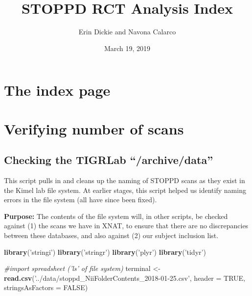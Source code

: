 \documentclass[]{article}
\title{STOPPD RCT Analysis Index}
\author{Erin Dickie and Navona Calarco}
\date{March 19, 2019}
\newenvironment{Shaded}{\begin{snugshade}}{\end{snugshade}}
\newcommand{\KeywordTok}[1]{\textcolor[rgb]{0.13,0.29,0.53}{\textbf{#1}}}
\newcommand{\DataTypeTok}[1]{\textcolor[rgb]{0.13,0.29,0.53}{#1}}
\newcommand{\StringTok}[1]{\textcolor[rgb]{0.31,0.60,0.02}{#1}}
\newcommand{\CommentTok}[1]{\textcolor[rgb]{0.56,0.35,0.01}{\textit{#1}}}
\newcommand{\OtherTok}[1]{\textcolor[rgb]{0.56,0.35,0.01}{#1}}
\newcommand{\NormalTok}[1]{#1}
\theoremstyle{definition}
\theoremstyle{definition}
\theoremstyle{definition}
\theoremstyle{remark}
\begin{document}
\maketitle

{
\setcounter{tocdepth}{2}
\tableofcontents
}
\section{The index page}\label{the-index-page}

\section{Verifying number of scans}\label{verifying-number-of-scans}

\subsection{\texorpdfstring{Checking the TIGRLab
``/archive/data''}{Checking the TIGRLab /archive/data}}\label{checking-the-tigrlab-archivedata}

This script pulls in and cleans up the naming of STOPPD scans as they
exist in the Kimel lab file system. At earlier stages, this script
helped us identify naming errors in the file system (all have since been
fixed).

\textbf{Purpose:} The contents of the file system will, in other
scripts, be checked against (1) the scans we have in XNAT, to ensure
that there are no discrepancies between these databases, and also
against (2) our subject inclusion list.

\begin{Shaded}
\begin{Highlighting}[]
\KeywordTok{library}\NormalTok{(}\StringTok{'stringi'}\NormalTok{)}
\KeywordTok{library}\NormalTok{(}\StringTok{'stringr'}\NormalTok{)}
\KeywordTok{library}\NormalTok{(}\StringTok{'plyr'}\NormalTok{)}
\KeywordTok{library}\NormalTok{(}\StringTok{'tidyr'}\NormalTok{)}
\end{Highlighting}
\end{Shaded}

\begin{Shaded}
\begin{Highlighting}[]
\CommentTok{#import spreadsheet ('ls' of file system)}
\NormalTok{terminal <-}\StringTok{ }\KeywordTok{read.csv}\NormalTok{(}\StringTok{'../data/stoppd_NiiFolderContents_2018-01-25.csv'}\NormalTok{, }\DataTypeTok{header =} \OtherTok{TRUE}\NormalTok{, }\DataTypeTok{stringsAsFactors =} \OtherTok{FALSE}\NormalTok{)}
\end{Highlighting}
\end{Shaded}
\end{document}
